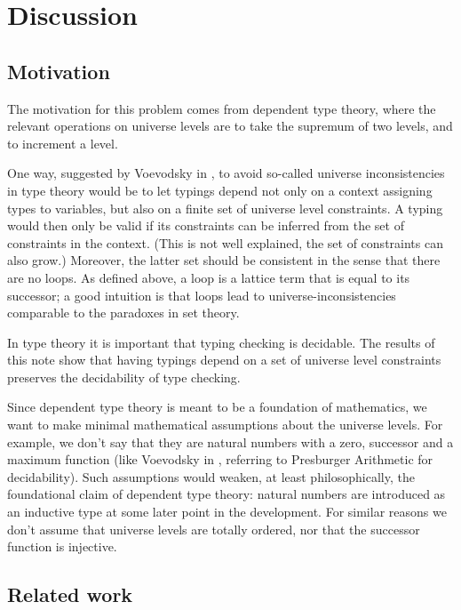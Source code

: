 \documentclass[11pt,a4paper]{article}
\begin{document}
\section{Discussion}

\subsection{Motivation}

The motivation for this problem comes from dependent type theory, 
where the relevant operations on universe levels are to take the
supremum of two levels, and to increment a level.

One way, {\color{red}suggested by Voevodsky in \cite{VV},}
to avoid so-called universe inconsistencies
in type theory would be to let typings depend not only
on a context assigning types to variables, but also on a
finite set of universe level constraints. A typing would then
only be valid if its constraints can be inferred from the set
of constraints in the context. 
{\color{red}(This is not well explained, the set of constraints can also grow.)}
 Moreover, the latter set should
be consistent in the sense that there are no loops. 
As defined above, a loop is a lattice term that is equal to its successor; 
a good intuition is that loops lead to universe-inconsistencies 
comparable to the paradoxes in set theory.

In type theory it is important that typing checking is decidable.
The results of this note show that having typings depend
on a set of universe level constraints preserves the decidability
of type checking.

Since dependent type theory is meant to be a foundation of mathematics,
we want to make minimal mathematical assumptions about the universe levels.
For example, we don't say that they are natural numbers
with a zero, successor and a maximum function {\color{red}(like Voevodsky in \cite{VV},
referring to Presburger Arithmetic for decidability)}.
Such assumptions would weaken, at least philosophically,
the foundational claim of dependent type theory:
natural numbers are introduced as an inductive type
at some later point in the development. For similar reasons
we don't assume that universe levels are totally ordered,
nor that the successor function is injective.


\subsection{Related work}
\end{document}
